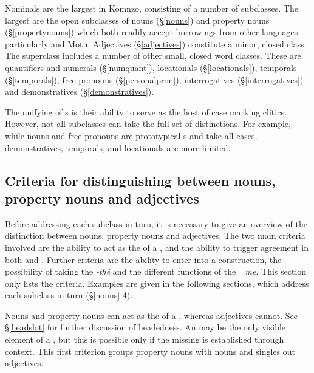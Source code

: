 Nominals are the largest  in Komnzo, consisting of a number of subclasses. The largest are the open subclasses of nouns (\S{}\ref{nouns}) and property nouns (\S{}\ref{propertynouns}) which both readily accept borrowings from other languages, particularly  and Motu. Adjectives (\S{}\ref{adjectives}) constitute a minor, closed class. The  superclass includes a number of other small, closed word classes. These are quantifiers and numerals (\S{}\ref{numquant}), locationals (\S{}\ref{locationals}), temporals (\S{}\ref{temporals}), free pronouns (\S{}\ref{personalpron}), interrogatives (\S{}\ref{interrogatives}) and demonstratives (\S{}\ref{demonstratives}).%

The unifying of s is their ability to serve as the host of case marking clitics. However, not all  subclasses can take the full set of  distinctions. For example, while nouns and free pronouns are prototypical s and take all cases, demonstratives, temporals, and locationals are more limited.

\subsection[Overview of criteria]{Criteria for distinguishing between nouns, property nouns and adjectives} \label{criteria-for-distinguishing-between-n-pn-adj}

Before addressing each subclass in turn, it is necessary to give an overview of the distinction between nouns, property nouns and adjectives. The two main criteria involved are the ability to act as the  of a , and the ability to trigger agreement in both  and . Further criteria are the ability to enter into a  construction, the possibility of taking the  \emph{-thé} and the different functions of the   \emph{=me}. This section only lists the criteria. Examples are given in the following sections, which address each subclass in turn (\S{}\ref{nouns}-4).%

Nouns and property nouns can act as the  of a , whereas adjectives cannot. See \S{}\ref{headslot} for further discussion of headedness. An  may be the only visible element of a , but this is possible only if the missing  is established through context. This first criterion groups property nouns with nouns and singles out adjectives.%

